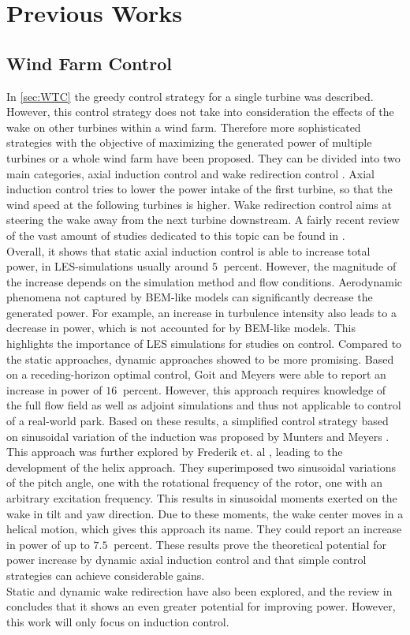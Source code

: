 \section{Previous Works}
\subsection{Wind Farm Control}
In \autoref{sec:WTC} the greedy control strategy for a single turbine was described. However, this control strategy does not take into consideration the effects of the wake on other turbines within a wind farm. Therefore more sophisticated strategies with the objective of maximizing the generated power of multiple turbines or a whole wind farm have been proposed. They can be divided into two main categories, axial induction control and wake redirection control \cite{boersma_tutorial_2017}.
Axial induction control tries to lower the power intake of the first turbine, so that the wind speed at the following turbines is higher. Wake redirection control aims at steering the wake away from the next turbine downstream. A fairly recent review of the vast amount of studies dedicated to this topic can be found in \cite{kheirabadi_quantitative_2019}. \\
Overall, it shows that static axial induction control is able to increase total power, in LES-simulations usually around $\SI{5}{}$ percent. However, the magnitude of the increase depends on the simulation method and flow conditions. Aerodynamic phenomena not captured by BEM-like models can significantly decrease the generated power. For example, an increase in turbulence intensity also leads to a decrease in power, which is not accounted for by BEM-like models. This highlights the importance of LES simulations for studies on control.
Compared to the static approaches, dynamic approaches showed to be more promising. Based on a receding-horizon optimal control, Goit and Meyers \cite{goit_optimal_2015} were able to report an increase in power of $\SI{16}{}$ percent. However, this approach requires knowledge of the full flow field as well as adjoint simulations and thus not applicable to control of a real-world park. Based on these results, a simplified control strategy based on sinusoidal variation of the induction was proposed by Munters and Meyers \cite{munters_towards_2018}. This approach was further explored by Frederik et. al \cite{frederik_helix_2020}, leading to the development of the helix approach. They superimposed two sinusoidal variations of the pitch angle, one with the rotational frequency of the rotor, one with an arbitrary excitation frequency. This results in sinusoidal moments exerted on the wake in tilt and yaw direction. Due to these moments, the wake center moves in a helical motion, which gives this approach its name. They could report an increase in power of up to $\SI{7.5}{}$ percent. These results prove the theoretical potential for power increase by dynamic axial induction control and that simple control strategies can achieve considerable gains. \\
Static and dynamic wake redirection have also been explored, and the review in \cite{kheirabadi_quantitative_2019} concludes that it shows an even greater potential for improving power. However, this work will only focus on induction control.
